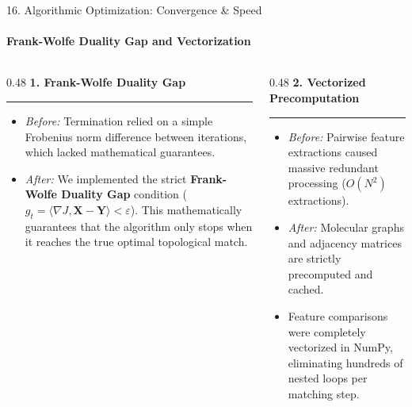 \documentclass[aspectratio=169, 11pt]{beamer}
\begin{document}
\begin{frame}{16. Algorithmic Optimization: Convergence \& Speed}
\framesubtitle{Frank-Wolfe Duality Gap and Vectorization}

\begin{columns}[T]
    \begin{column}{0.48\textwidth}
        \textbf{1. Frank-Wolfe Duality Gap}
        \hrule
        \vspace{0.4em}
        \small
        \begin{itemize}
            \item \textit{Before:} Termination relied on a simple Frobenius norm difference between iterations, which lacked mathematical guarantees.
            \item \textit{After:} We implemented the strict \textbf{Frank-Wolfe Duality Gap} condition ($g_t = \langle \nabla J, \mathbf{X} - \mathbf{Y} \rangle < \varepsilon$). This mathematically guarantees that the algorithm only stops when it reaches the true optimal topological match.
        \end{itemize}
    \end{column}

    \hfill\vrule\hfill

    \begin{column}{0.48\textwidth}
        \textbf{2. Vectorized Precomputation}
        \hrule
        \vspace{0.4em}
        \small
        \begin{itemize}
            \item \textit{Before:} Pairwise feature extractions caused massive redundant processing ($O(N^2)$ extractions).
            \item \textit{After:} Molecular graphs and adjacency matrices are strictly precomputed and cached.
            \item Feature comparisons were completely vectorized in NumPy, eliminating hundreds of nested loops per matching step.
        \end{itemize}
    \end{column}
\end{columns}
\end{frame}
\end{document}
